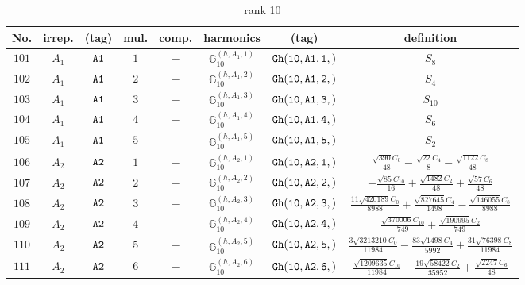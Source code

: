 \documentclass[fleqn,8pt]{jsarticle}
\begin{document}
\begin{table}[ht!]
\begin{center}
\caption{rank 10}
\renewcommand{\arraystretch}{1.3}
\begin{tabular}{cccccccc} \hline \hline
No. & irrep. & (tag) & mul. & comp. & harmonics & (tag) & definition \\ \hline
$ 101 $ & $ A_{1} $ & $ {\tt A1} $ & $ 1 $ & $ - $ & $ \mathbb{G}_{10}^{(h,A_{1},1)} $ & $ {\tt Gh(10,A1,1,)} $ & $ S_{8} $ \\
$ 102 $ & $ A_{1} $ & $ {\tt A1} $ & $ 2 $ & $ - $ & $ \mathbb{G}_{10}^{(h,A_{1},2)} $ & $ {\tt Gh(10,A1,2,)} $ & $ S_{4} $ \\
$ 103 $ & $ A_{1} $ & $ {\tt A1} $ & $ 3 $ & $ - $ & $ \mathbb{G}_{10}^{(h,A_{1},3)} $ & $ {\tt Gh(10,A1,3,)} $ & $ S_{10} $ \\
$ 104 $ & $ A_{1} $ & $ {\tt A1} $ & $ 4 $ & $ - $ & $ \mathbb{G}_{10}^{(h,A_{1},4)} $ & $ {\tt Gh(10,A1,4,)} $ & $ S_{6} $ \\
$ 105 $ & $ A_{1} $ & $ {\tt A1} $ & $ 5 $ & $ - $ & $ \mathbb{G}_{10}^{(h,A_{1},5)} $ & $ {\tt Gh(10,A1,5,)} $ & $ S_{2} $ \\
$ 106 $ & $ A_{2} $ & $ {\tt A2} $ & $ 1 $ & $ - $ & $ \mathbb{G}_{10}^{(h,A_{2},1)} $ & $ {\tt Gh(10,A2,1,)} $ & $ \frac{\sqrt{390} C_{0}}{48} - \frac{\sqrt{22} C_{4}}{8} - \frac{\sqrt{1122} C_{8}}{48} $ \\
$ 107 $ & $ A_{2} $ & $ {\tt A2} $ & $ 2 $ & $ - $ & $ \mathbb{G}_{10}^{(h,A_{2},2)} $ & $ {\tt Gh(10,A2,2,)} $ & $ - \frac{\sqrt{85} C_{10}}{16} + \frac{\sqrt{1482} C_{2}}{48} + \frac{\sqrt{57} C_{6}}{48} $ \\
$ 108 $ & $ A_{2} $ & $ {\tt A2} $ & $ 3 $ & $ - $ & $ \mathbb{G}_{10}^{(h,A_{2},3)} $ & $ {\tt Gh(10,A2,3,)} $ & $ \frac{11 \sqrt{420189} C_{0}}{8988} + \frac{\sqrt{827645} C_{4}}{1498} - \frac{\sqrt{146055} C_{8}}{8988} $ \\
$ 109 $ & $ A_{2} $ & $ {\tt A2} $ & $ 4 $ & $ - $ & $ \mathbb{G}_{10}^{(h,A_{2},4)} $ & $ {\tt Gh(10,A2,4,)} $ & $ \frac{\sqrt{370006} C_{10}}{749} + \frac{\sqrt{190995} C_{2}}{749} $ \\
$ 110 $ & $ A_{2} $ & $ {\tt A2} $ & $ 5 $ & $ - $ & $ \mathbb{G}_{10}^{(h,A_{2},5)} $ & $ {\tt Gh(10,A2,5,)} $ & $ \frac{3 \sqrt{3213210} C_{0}}{11984} - \frac{83 \sqrt{1498} C_{4}}{5992} + \frac{31 \sqrt{76398} C_{8}}{11984} $ \\
$ 111 $ & $ A_{2} $ & $ {\tt A2} $ & $ 6 $ & $ - $ & $ \mathbb{G}_{10}^{(h,A_{2},6)} $ & $ {\tt Gh(10,A2,6,)} $ & $ \frac{\sqrt{1209635} C_{10}}{11984} - \frac{19 \sqrt{58422} C_{2}}{35952} + \frac{\sqrt{2247} C_{6}}{48} $ \\

\end{tabular}
\end{center}
\end{table}
\end{document}
